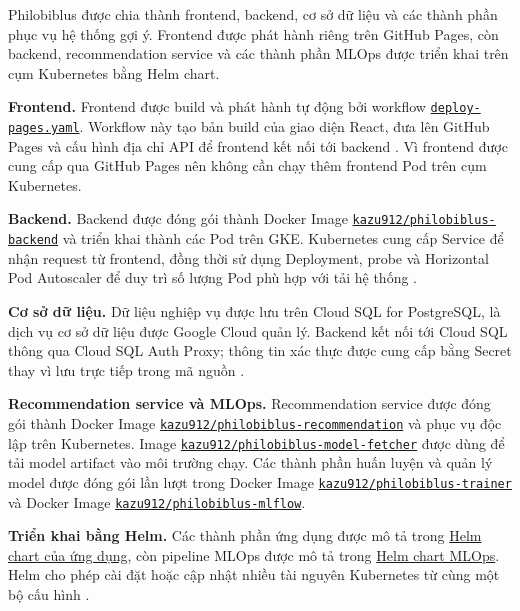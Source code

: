 
Philobiblus được chia thành frontend, backend, cơ sở dữ liệu và các thành phần phục vụ hệ thống gợi ý. Frontend được phát hành riêng trên GitHub Pages, còn backend, recommendation service và các thành phần MLOps được triển khai trên cụm Kubernetes bằng Helm chart.

\textbf{Frontend.} Frontend được build và phát hành tự động bởi workflow \href{https://github.com/kazunguyen/philobiblus/blob/main/.github/workflows/deploy-pages.yaml}{\texttt{deploy-pages.yaml}}. Workflow này tạo bản build của giao diện React, đưa lên GitHub Pages và cấu hình địa chỉ API để frontend kết nối tới backend \cite{github-actions}. Vì frontend được cung cấp qua GitHub Pages nên không cần chạy thêm frontend Pod trên cụm Kubernetes.

\textbf{Backend.} Backend được đóng gói thành Docker Image \href{https://hub.docker.com/r/kazu912/philobiblus-backend}{\texttt{kazu912/philobiblus-backend}} và triển khai thành các Pod trên GKE. Kubernetes cung cấp Service để nhận request từ frontend, đồng thời sử dụng Deployment, probe và Horizontal Pod Autoscaler để duy trì số lượng Pod phù hợp với tải hệ thống \cite{docker,kubernetes,gke-autopilot}.

\textbf{Cơ sở dữ liệu.} Dữ liệu nghiệp vụ được lưu trên Cloud SQL for PostgreSQL, là dịch vụ cơ sở dữ liệu được Google Cloud quản lý. Backend kết nối tới Cloud SQL thông qua Cloud SQL Auth Proxy; thông tin xác thực được cung cấp bằng Secret thay vì lưu trực tiếp trong mã nguồn \cite{cloud-sql}.

\textbf{Recommendation service và MLOps.} Recommendation service được đóng gói thành Docker Image \href{https://hub.docker.com/r/kazu912/philobiblus-recommendation}{\texttt{kazu912/philobiblus-recommendation}} và phục vụ độc lập trên Kubernetes. Image \href{https://hub.docker.com/r/kazu912/philobiblus-model-fetcher}{\texttt{kazu912/philobiblus-model-fetcher}} được dùng để tải model artifact vào môi trường chạy. Các thành phần huấn luyện và quản lý model được đóng gói lần lượt trong Docker Image \href{https://hub.docker.com/r/kazu912/philobiblus-trainer}{\texttt{kazu912/philobiblus-trainer}} và Docker Image \href{https://hub.docker.com/r/kazu912/philobiblus-mlflow}{\texttt{kazu912/philobiblus-mlflow}}.

\textbf{Triển khai bằng Helm.} Các thành phần ứng dụng được mô tả trong \href{https://github.com/kazunguyen/philobiblus/tree/main/kubernetes/helm/philobiblus}{Helm chart của ứng dụng}, còn pipeline MLOps được mô tả trong \href{https://github.com/kazunguyen/philobiblus/tree/main/kubernetes/helm/philobiblus-mlops}{Helm chart MLOps}. Helm cho phép cài đặt hoặc cập nhật nhiều tài nguyên Kubernetes từ cùng một bộ cấu hình \cite{helm-charts}.


